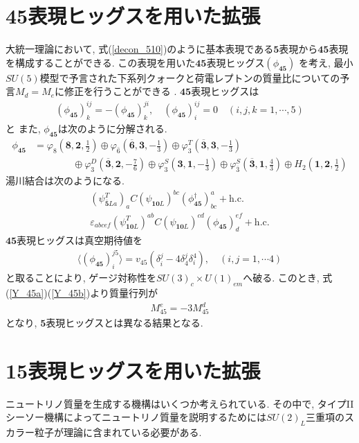\section{45表現ヒッグスを用いた拡張}
大統一理論において, 式(\ref{decon_510})のように基本表現である$\bm{5}$表現から$\bm{45}$表現を構成することができる.
この表現を用いた$\bm{45}$表現ヒッグス$(\phi_{\bm{45}})$ を考え, 
最小$SU(5)$模型で予言された下系列クォークと荷電レプトンの質量比についての予言$M_d = M_e$に修正を行うことができる
\cite{framptonEstimateFlavorNumber1979,georgiNewLeptonquarkMass1979}.
$\bm{45}$表現ヒッグスは
\begin{align}
  \left(\phi_{\bm{45}}\right)^{ij}_k = -(\phi_{\bm{45}})^{ji}_k,\quad (\phi_{\bm{45}})^{ij}_i =0 \quad(i,j,k =1,\cdots,5)\nonumber
\end{align}
と
また, $\phi_{\bm{45}}$は次のように分解される.
\begin{align}
  \phi_{\bm{45}} &= \varphi_8 \left(\bm{8}, \bm{2}, \frac{1}{2}\right) \oplus \varphi_{\bar{6}}\left(\overline{\bm{6}}, \bm{3}, -\frac{1}{3}\right) \oplus \varphi_3^T\left(\overline{\bm{3}}, \bm{3}, -\frac{1}{3}\right) \nonumber\\
                 &\qquad\qquad\oplus \varphi_3^D\left( \overline{\bm{3}}, \bm{2}, -\frac{7}{6}\right) \oplus \varphi_3^S\left(\bm{3}, \bm{1}, -\frac{1}{3}\right)\oplus \varphi_{\overline{3}}^S\left( \overline{\bm{3}}, \bm{1}, \frac{4}{3}\right)\oplus H_2\left(\bm{1}, \bm{2}, \frac{1}{2}\right)\nonumber
\end{align}
湯川結合は次のようになる.
\begin{align}
  (\psi_{\bm{\bar{5}}La}^T)_a C (\psi_{\bm{10}L})^{bc} (\phi_{\bm{45}}^\dagger)_{bc}^a+\mathrm{h.c.}\label{Y_45a}\\
  \varepsilon_{abcef} (\psi_{\bm{10}L}^T)^{ab} C (\psi_{\bm{10}L})^{cd} (\phi_{\bm{45}})_d^{ef}+ \mathrm{h.c.}\label{Y_45b}
\end{align}
$\bm{45}$表現ヒッグスは真空期待値を
\begin{align}
  \langle (\phi_{\bm{45}})^{j5}_i\rangle = v_{45}\left(\delta^j_i - 4\delta^j_4 \delta_i^4\right),\quad(i,j=1,\cdots 4)
\end{align}
と取ることにより, ゲージ対称性を$SU(3)_c\times U(1)_{em}$へ破る.
このとき, 式(\ref{Y_45a})(\ref{Y_45b})より質量行列が
\begin{align}
  M^e_{45} = -3M_{45}^d
\end{align}
となり, $\bm{5}$表現ヒッグスとは異なる結果となる.

\section{15表現ヒッグスを用いた拡張}
ニュートリノ質量を生成する機構はいくつか考えられている.
その中で, タイプIIシーソー機構によってニュートリノ質量を説明するためには$SU(2)_L$三重項のスカラー粒子が理論に含まれている必要がある.

